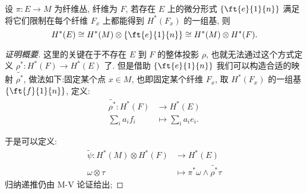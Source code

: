     \begin{theorem}
        设 $\pi:E\rightarrow M$ 为纤维丛, 纤维为 $F$, 若存在 $E$ 上的微分形式 $\{\ft{e}{1}{n}\}$ 满足将它们限制在每个纤维 $F_x$ 上都能得到 $H^*(F_x)$ 的一组基, 
        则
        \begin{equation*}
            H^*(E)\cong H^*(M)\otimes\{\ft{e}{1}{n}\}\cong H^*(M)\otimes H^*(F).
        \end{equation*}
    \end{theorem}
    \begin{proof}[证明概要]
        这里的关键在于不存在 $E$ 到 $F$ 的整体投影 $\rho$, 也就无法通过这个方式定义 $\rho^*:H^*(F)\rightarrow H^*(E)$ 了. 
        但是借助 $\{\ft{e}{1}{n}\}$ 我们可以构造合适的映射 $\tilde{\rho^*}$, 做法如下:固定某个点 $x\in M$, 也即固定某个纤维 $F_x$, 
        取 $H^*(F_x)$ 的一组基 $\{\ft{f}{1}{n}\}$, 定义:
        \begin{align*}
            \tilde{\rho^*}:H^*(F)&\rightarrow H^*(E) \\
            \sum_{i}a_if_i&\mapsto\sum_{i}a_ie_i.
        \end{align*} 

        于是可以定义:
        \begin{align*}
            \tilde{\psi}:H^*(M)\otimes H^*(F)&\rightarrow H^*(E) \\
            \omega\otimes\tau&\mapsto\pi^*\omega\wedge\tilde{\rho^*}\tau
        \end{align*}
        归纳递推仍由 M-V 论证给出; 
        
        

\end{proof}
